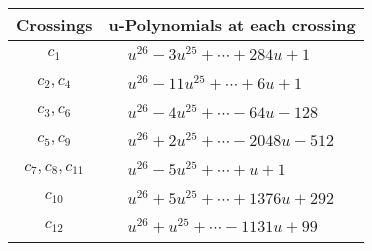 \documentclass[1p]{elsarticle_modified}
\theoremstyle{definition}
\begin{document}
\begin{tabular}{m{50pt}|m{274pt}}
Crossings & \hspace{64pt}u-Polynomials at each crossing \\
\hline $$\begin{aligned}c_{1}\end{aligned}$$&$\begin{aligned}
&u^{26}-3 u^{25}+\cdots+284 u+1
\end{aligned}$\\
\hline $$\begin{aligned}c_{2},c_{4}\end{aligned}$$&$\begin{aligned}
&u^{26}-11 u^{25}+\cdots+6 u+1
\end{aligned}$\\
\hline $$\begin{aligned}c_{3},c_{6}\end{aligned}$$&$\begin{aligned}
&u^{26}-4 u^{25}+\cdots-64 u-128
\end{aligned}$\\
\hline $$\begin{aligned}c_{5},c_{9}\end{aligned}$$&$\begin{aligned}
&u^{26}+2 u^{25}+\cdots-2048 u-512
\end{aligned}$\\
\hline $$\begin{aligned}c_{7},c_{8},c_{11}\end{aligned}$$&$\begin{aligned}
&u^{26}-5 u^{25}+\cdots+u+1
\end{aligned}$\\
\hline $$\begin{aligned}c_{10}\end{aligned}$$&$\begin{aligned}
&u^{26}+5 u^{25}+\cdots+1376 u+292
\end{aligned}$\\
\hline $$\begin{aligned}c_{12}\end{aligned}$$&$\begin{aligned}
&u^{26}+u^{25}+\cdots-1131 u+99
\end{aligned}$\\
\hline
\end{tabular}\\~\\
\newpage\renewcommand{\arraystretch}{1}
\end{document}
